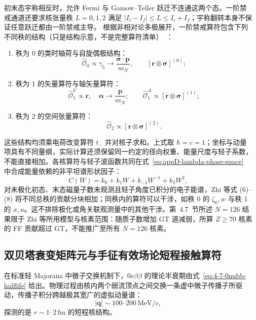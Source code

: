 初末态宇称相反时，允许 Fermi 与 Gamow--Teller 跃迁不连通这两个态。一阶禁戒通道还要求核张量秩 $L=0,1,2$ 满足 $|I_i-I_f|\le L\le I_i+I_f$；宇称翻转本身不保证任意跃迁都由一阶禁戒主导。
根据非相对论多极展开，一阶禁戒算符包含下列不同秩的结构（只是结构示意，不是完整算符清单）~\cite{doctoral-r1-g34-zhi-2013-prc-shell-model-half-lives}：
\begin{enumerate}
\item 秩为 0 的类时轴荷与自旋偶极结构：
\begin{equation}\label{eq:appD-ff-rank0}
\hat{\mathcal{O}}_0 \propto \gamma_5 \to \frac{\boldsymbol{\sigma} \cdot \mathbf{p}}{m_N}, \qquad [\mathbf r\otimes\boldsymbol\sigma]^{(0)};
\end{equation}
\item 秩为 1 的矢量算符与轴矢量算符：
\begin{equation}\label{eq:appD-ff-rank1}
\hat{\mathcal{O}}_1^V \propto \mathbf{r}, \quad \boldsymbol{\alpha} \to \frac{\mathbf{p}}{m_N}; \qquad \hat{\mathcal{O}}_1^A \propto [\mathbf{r} \otimes \boldsymbol{\sigma}]^{(1)};
\end{equation}
\item 秩为 2 的空间张量算符：
\begin{equation}\label{eq:appD-ff-rank2}
\hat{\mathcal{O}}_2 \propto [\mathbf{r} \otimes \boldsymbol{\sigma}]^{(2)}.
\end{equation}
\end{enumerate}
这些结构均须乘电荷改变算符 $t_-$ 并对核子求和。上式取 $\hbar=c=1$；坐标与动量项具有不同量纲，实际计算还须保留同一约定的径向权重、能量尺度与轻子系数，不能直接相加。各核算符与轻子波函数共同在式~\eqref{eq:appD-lambda-phase-space} 中合成能量依赖的非平坦谱形状因子：
\begin{equation}\label{eq:appD-ff-shape-factor}
C(W) = k_0 + k_1 W + k_{-1} W^{-1} + k_2 W^2,
\end{equation}
对未极化初态、末态磁量子数未观测且轻子角度已积分的电子能谱，Zhi 等式 (6)--(8) 将不同总秩的贡献分块相加；同秩内的算符可以干涉，如秩 0 的 $\zeta_0,w$ 与秩 1 的 $x,u$。这不排除极化或角关联观测量中的其他干涉。第~4.7~节所述 $N=126$ 结果限于 Zhi 等所用模型与核素范围：随质子数增加 GT 道减弱，所算 $Z\ge70$ 核素的 FF 贡献超过 GT，不能推广至所有 $N=126$ 核素。

\subsection{双贝塔衰变矩阵元与手征有效场论短程接触算符}

在标准轻 Majorana 中微子交换机制下，$0\nu\beta\beta$ 的理论半衰期由式~\eqref{eq:4-7-0nubb-halflife} 给出。物理过程由核内两个弱流顶点之间交换一条虚中微子传播子所驱动，传播子积分跨越极其宽广的虚拟动量谱：
\begin{equation}\label{eq:appD-0nubb-virtual-momentum}
|\mathbf{q}| \sim 100\text{--}200\,\mathrm{MeV}/c,
\end{equation}
探测的是 $r \sim 1$–$2\,\text{fm}$ 的短程核结构。

